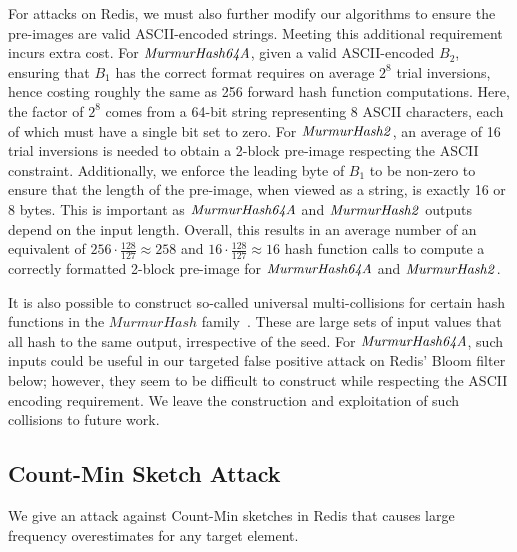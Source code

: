For attacks on Redis, we must also further modify our algorithms to ensure the pre-images are valid ASCII-encoded strings. Meeting this additional requirement incurs extra cost. 
For $\mathit{MurmurHash64A}$, given a valid ASCII-encoded $B_2$, ensuring that $B_1$ has the correct format requires on average $2^8$ trial inversions, hence costing roughly the same as 256 forward hash function computations. 
Here, the factor of $2^8$ comes from a 64-bit string representing 8 ASCII characters, each of which must have a single bit set to zero. 
For $\mathit{MurmurHash2}$, an average of 16 trial inversions is needed to obtain a 2-block pre-image respecting the ASCII constraint. 
Additionally, we enforce the leading byte of $B_1$ to be non-zero to ensure that the length of the pre-image, when viewed as a string, is exactly 16 or 8 bytes. This is important as $\mathit{MurmurHash64A}$ and $\mathit{MurmurHash2}$ outputs depend on the input length. 
Overall, this results in an average number of an equivalent of $256\cdot \frac{128}{127}\approx258$ and $16\cdot \frac{128}{127}\approx16$ hash function calls to compute a correctly formatted 2-block pre-image for $\mathit{MurmurHash64A}$ and $\mathit{MurmurHash2}$.

It is also possible to construct so-called universal multi-collisions for certain hash functions in the $\mathit{MurmurHash}$ family~\cite{MurmurUMC}. These are large sets of input values that all hash to the same output, irrespective of the seed. For $\mathit{MurmurHash64A}$, such inputs could be useful in our targeted false positive attack on Redis' Bloom filter below; however, they seem to be difficult to construct while respecting the ASCII encoding requirement. We leave the construction and exploitation of such collisions to future work.

\subsection{Count-Min Sketch Attack}\label{attacks:cms}

We give an attack against Count-Min sketches in Redis that causes large frequency overestimates for any target element.

